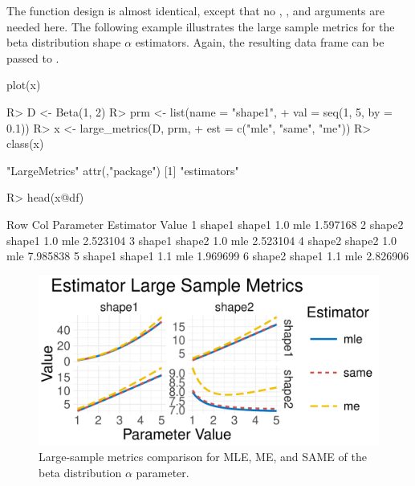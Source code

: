 \documentclass[nojss]{jss}
\newcommand{\fct}[1]{\code{#1()}}
\begin{document}
The \fct{large\_metrics} function design is almost identical, except that no , , and  arguments are needed here. The following example illustrates the large sample metrics for the beta distribution shape $\alpha$ estimators. Again, the resulting data frame can be passed to \fct{plot}.

\begin{CodeChunk}
\begin{CodeInput}
plot(x)
\end{CodeInput}
\end{CodeChunk}

\begin{Schunk}
\begin{Sinput}
R> D <- Beta(1, 2)
R> prm <- list(name = "shape1",
+              val = seq(1, 5, by = 0.1))
R> x <- large_metrics(D, prm,
+                     est = c("mle", "same", "me"))
R> class(x)
\end{Sinput}
\begin{Soutput}
[1] "LargeMetrics"
attr(,"package")
[1] "estimators"
\end{Soutput}
\begin{Sinput}
R> head(x@df)
\end{Sinput}
\begin{Soutput}
     Row    Col Parameter Estimator    Value
1 shape1 shape1       1.0       mle 1.597168
2 shape2 shape1       1.0       mle 2.523104
3 shape1 shape2       1.0       mle 2.523104
4 shape2 shape2       1.0       mle 7.985838
5 shape1 shape1       1.1       mle 1.969699
6 shape2 shape1       1.1       mle 2.826906
\end{Soutput}
\end{Schunk}

\begin{figure}[t!]
\centering
\includegraphics{estimators-vis_large_beta}
  \caption{\label{fig:vis-large-beta} Large-sample metrics comparison for MLE, ME, and SAME of the beta distribution $\alpha$ parameter.}
\end{figure}
\end{document}
